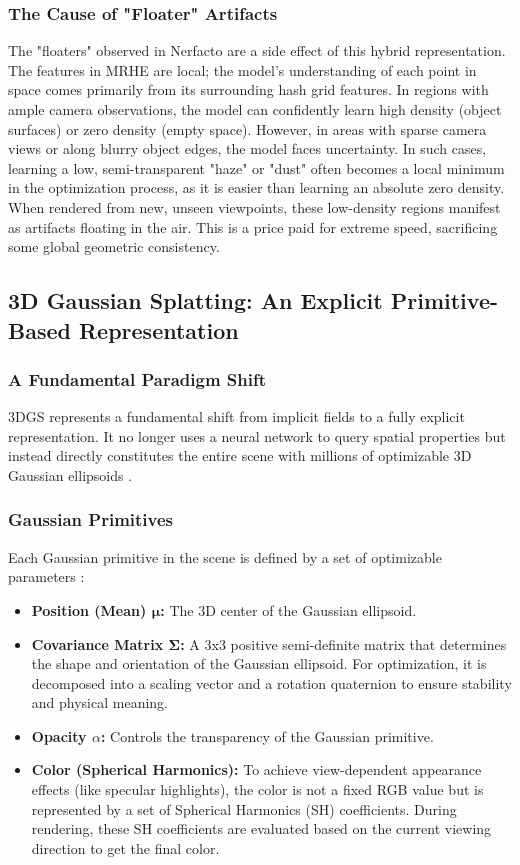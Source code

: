 \documentclass[11pt]{article}
\begin{document}
\subsubsection{The Cause of "Floater" Artifacts}
The "floaters" observed in Nerfacto are a side effect of this hybrid representation. The features in MRHE are local; the model's understanding of each point in space comes primarily from its surrounding hash grid features. In regions with ample camera observations, the model can confidently learn high density (object surfaces) or zero density (empty space). However, in areas with sparse camera views or along blurry object edges, the model faces uncertainty. In such cases, learning a low, semi-transparent "haze" or "dust" often becomes a local minimum in the optimization process, as it is easier than learning an absolute zero density. When rendered from new, unseen viewpoints, these low-density regions manifest as artifacts floating in the air. This is a price paid for extreme speed, sacrificing some global geometric consistency.

\subsection{3D Gaussian Splatting: An Explicit Primitive-Based Representation}

\subsubsection{A Fundamental Paradigm Shift}
3DGS represents a fundamental shift from implicit fields to a fully explicit representation. It no longer uses a neural network to query spatial properties but instead directly constitutes the entire scene with millions of optimizable 3D Gaussian ellipsoids \cite{kerbl2023gaussiansplatting}.

\subsubsection{Gaussian Primitives}
Each Gaussian primitive in the scene is defined by a set of optimizable parameters \cite{arxiv2408_3dgs}:
\begin{itemize}
    \item \textbf{Position (Mean) $\boldsymbol{\mu}$:} The 3D center of the Gaussian ellipsoid.
    \item \textbf{Covariance Matrix $\boldsymbol{\Sigma}$:} A 3x3 positive semi-definite matrix that determines the shape and orientation of the Gaussian ellipsoid. For optimization, it is decomposed into a scaling vector and a rotation quaternion to ensure stability and physical meaning.
    \item \textbf{Opacity ${\alpha}$:} Controls the transparency of the Gaussian primitive.
    \item \textbf{Color (Spherical Harmonics):} To achieve view-dependent appearance effects (like specular highlights), the color is not a fixed RGB value but is represented by a set of Spherical Harmonics (SH) coefficients. During rendering, these SH coefficients are evaluated based on the current viewing direction to get the final color.
\end{itemize}
\end{document}
